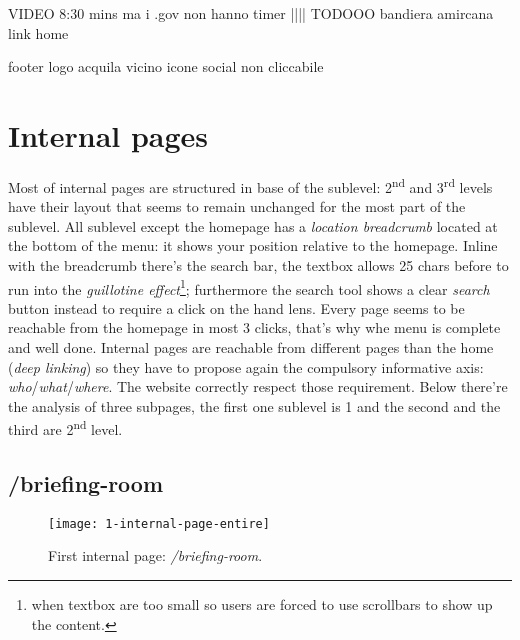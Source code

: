 \documentclass[
10pt, %
a4paper, %
oneside, %
headinclude,footinclude, %
BCOR5mm, %
]{scrartcl}
\begin{document}
VIDEO 8:30 mins ma i .gov non hanno timer
 |||| TODOOO
bandiera amircana link home

footer logo acquila vicino icone social non cliccabile


\section{Internal pages}
Most of internal pages are structured in base of the sublevel: 2\textsuperscript{nd} and 3\textsuperscript{rd} levels have their layout that seems to remain unchanged for the most part of the sublevel.
All sublevel except the homepage has a \emph{location breadcrumb} located at the bottom of the menu: it shows your position relative to the homepage. Inline with the breadcrumb there's the search bar, the textbox allows 25 chars before to run into the \emph{guillotine effect}\footnote{when textbox are too small so users are forced to use scrollbars to show up the content.}; furthermore the search tool shows a clear \emph{search} button instead to require a click on the hand lens. 
Every page seems to be reachable from the homepage in most 3 clicks, that's why whe menu is complete and well done. 
Internal pages are reachable from different pages than the home (\emph{deep linking}) so they have to propose again the compulsory informative axis: \emph{who}/\emph{what}/\emph{where}. The website correctly respect those requirement.
Below there're the analysis of three subpages, the first one sublevel is 1 and the second and the third are 2\textsuperscript{nd} level.

	\subsection{/briefing-room}
	\label{primapaginainterna}
	

	\begin{figure}[h!]
	\centering 
	\centerline{\texttt{[image: 1-internal-page-entire]}}
	\caption[First internal page: /briefing-room]{First internal page: \emph{/briefing-room}.}
	\label{fig:primapaginainterna} 
	\end{figure}
\end{document}
